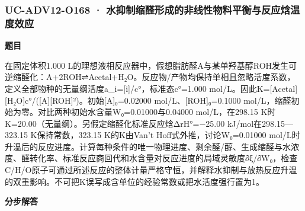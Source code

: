 \documentclass[UTF8,11pt,a4paper]{ctexart}
\begin{document}
\subsubsection*{UC-ADV12-O168 · 水抑制缩醛形成的非线性物料平衡与反应焓温度效应}
\noindent\textbf{题目}\par
在固定体积1.000 L的理想液相反应器中，假想脂肪醛A与某单羟基醇ROH发生可逆缩醛化：A+2ROH⇌Acetal+H₂O。反应物/产物均保持单相且忽略活度系数，定义全部物种的无量纲活度a\_i=[i]/c°，标准态c°=1.000 mol/L。因此K=[Acetal][H₂O]c°/([A][ROH]²)。初始[A]₀=0.02000 mol/L、[ROH]₀=0.1000 mol/L，缩醛初始为零。对比两种初始水含量W₀=0.01000与0.04000 mol/L，在298.15 K时K=20.00（无量纲）。另假定缩醛化标准反应焓ΔrH°=−25.00 kJ/mol在298.15—323.15 K保持常数，323.15 K的K由Van’t Hoff式外推，讨论W₀=0.01000 mol/L时升温后的反应进度。计算每种条件的唯一物理进度、剩余醛/醇、生成缩醛与水浓度、醛转化率、标准反应商回代和水含量对反应进度的局域灵敏度∂ξ/∂W₀，检查C/H/O原子可通过所述反应的整体计量严格守恒，并解释水抑制与放热反应升温的双重影响。不可把K误写成含单位的经验常数或把水活度强行置为1。\par
\medskip\noindent\textbf{分步解答}
\end{document}
